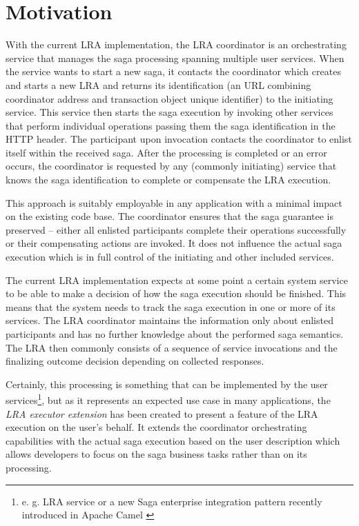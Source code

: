 \documentclass[oneside,
  digital, %
  table,   %
  lof,     %
  lot,     %
]{fithesis3}
\begin{document}
\section{Motivation}

With the current LRA implementation, the LRA coordinator is an orchestrating service that manages the saga processing spanning multiple user services. When the service wants to start a new saga, it contacts the coordinator which creates and starts a new LRA and returns its identification (an URL combining coordinator address and transaction object unique identifier) to the initiating service. This service then starts the saga execution by invoking other services that perform individual operations passing them the saga identification in the HTTP header. The participant upon invocation contacts the coordinator to enlist itself within the received saga. After the processing is completed or an error occurs, the coordinator is requested by any (commonly initiating) service that knows the saga identification to complete or compensate the LRA execution.

This approach is suitably employable in any application with a minimal impact on the existing code base. The coordinator ensures that the saga guarantee is preserved -- either all enlisted participants complete their operations successfully or their compensating actions are invoked. It does not influence the actual saga execution which is in full control of the initiating and other included services.

The current LRA implementation expects at some point a certain system service to be able to make a decision of how the saga execution should be finished. This means that the system needs to track the saga execution in one or more of its services. The LRA coordinator maintains the information only about enlisted participants and has no further knowledge about the performed saga semantics. The LRA then commonly consists of a sequence of service invocations and the finalizing outcome decision depending on collected responses.

Certainly, this processing is something that can be implemented by the user services\footnote{e. g. LRA service or a new Saga enterprise integration pattern recently introduced in Apache Camel \cite{camel_saga}}, but as it represents an expected use case in many applications, the \textit{LRA executor extension} has been created to present a feature of the LRA execution on the user's behalf. It extends the coordinator orchestrating capabilities with the actual saga execution based on the user description which allows developers to focus on the saga business tasks rather than on its processing.
\end{document}
